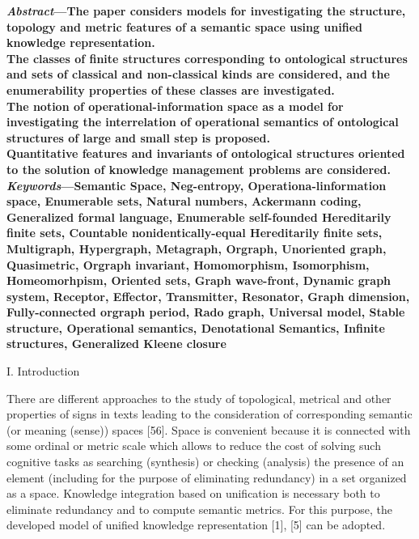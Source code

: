 \begin{multicols}{2}
 \small \textbf{ \textit{ Abstract}—The paper considers models for investigating
the structure, topology and metric features of a semantic
space using unified knowledge representation.
\\ The classes of finite structures corresponding to ontological structures and sets of classical and non-classical kinds
are considered, and the enumerability properties of these
classes are investigated.
\\ The notion of operational-information space as a model
for investigating the interrelation of operational semantics
of ontological structures of large and small step is proposed.
\\ Quantitative features and invariants of ontological structures oriented to the solution of knowledge management
problems are considered.\\
\textit{Keywords}—Semantic Space, Neg-entropy, Operationa-linformation space, Enumerable sets, Natural numbers,
Ackermann coding, Generalized formal language, Enumerable self-founded Hereditarily finite sets, Countable nonidentically-equal Hereditarily finite sets, Multigraph, Hypergraph, Metagraph, Orgraph, Unoriented graph, Quasimetric, Orgraph invariant, Homomorphism, Isomorphism,
Homeomorhpism, Oriented sets, Graph wave-front, Dynamic graph system, Receptor, Effector, Transmitter, Resonator, Graph dimension, Fully-connected orgraph period,
Rado graph, Universal model, Stable structure, Operational
semantics, Denotational Semantics, Infinite structures, Generalized Kleene closure}
\begin{center}
  \big  I. Introduction
\end{center}
There are different approaches to the study of topological, metrical and other properties of signs in texts
leading to the consideration of corresponding semantic
(or meaning (sense)) spaces [56].
\newline Space is convenient because it is connected with some
ordinal or metric scale which allows to reduce the cost of
solving such cognitive tasks as searching (synthesis) or
checking (analysis) the presence of an element (including
for the purpose of eliminating redundancy) in a set
organized as a space.
\newline Knowledge integration based on unification is necessary both to eliminate redundancy and to compute semantic metrics. For this purpose, the developed model of
unified knowledge representation [1], [5] can be adopted.
\begin{center}

\end{center}
\end{multicols}
